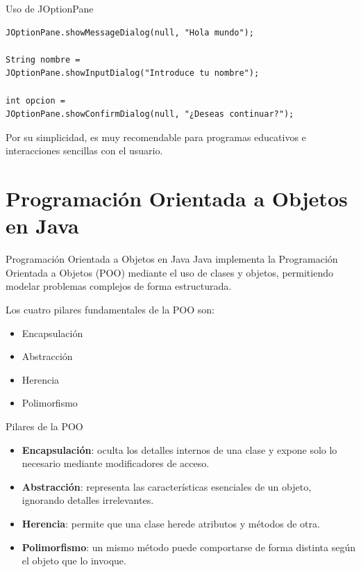 \documentclass{beamer}
\begin{document}
\begin{frame}[fragile]{Uso de JOptionPane}

\begin{verbatim}
JOptionPane.showMessageDialog(null, "Hola mundo");

String nombre =
JOptionPane.showInputDialog("Introduce tu nombre");

int opcion =
JOptionPane.showConfirmDialog(null, "¿Deseas continuar?");
\end{verbatim}

Por su simplicidad, es muy recomendable para programas educativos e interacciones sencillas con el usuario.
\end{frame}

\section{Programación Orientada a Objetos en Java}
\begin{frame}{Programación Orientada a Objetos en Java}
Java implementa la Programación Orientada a Objetos (POO) mediante el uso de clases y objetos, permitiendo modelar problemas complejos de forma estructurada.

Los cuatro pilares fundamentales de la POO son:
\begin{itemize}
    \item Encapsulación
    \item Abstracción
    \item Herencia
    \item Polimorfismo
\end{itemize}
\end{frame}

\begin{frame}{Pilares de la POO}
\begin{itemize}
    \item \textbf{Encapsulación}: oculta los detalles internos de una clase y expone solo lo necesario mediante modificadores de acceso.
    \item \textbf{Abstracción}: representa las características esenciales de un objeto, ignorando detalles irrelevantes.
    \item \textbf{Herencia}: permite que una clase herede atributos y métodos de otra.
    \item \textbf{Polimorfismo}: un mismo método puede comportarse de forma distinta según el objeto que lo invoque.
\end{itemize}
\end{frame}
\end{document}
